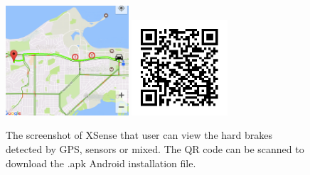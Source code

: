 \begin{figure}[!tb]
\begin{center}
\includegraphics[width=1.8in, angle=0]{Figs/DriveSense/cut_app.png}
\includegraphics[width=1.4in, angle=0]{Figs/DriveSense/qrcode_xsense.png}
	\vspace{0.0cm}
\caption{The screenshot of XSense that user can view the hard brakes
	detected by GPS, sensors or mixed. The QR code can be scanned 
	to download the .apk Android installation file.}
\vspace{-0.2cm}
\label{xsense_app}
\end{center}
\end{figure}



